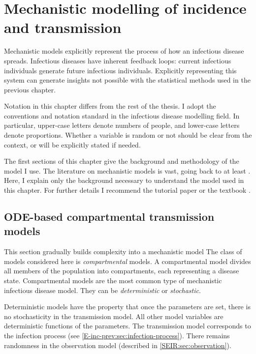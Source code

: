 \documentclass[thesis.tex]{subfiles}
\begin{document}
\ifSubfilesClassLoaded{
    \setcounter{chapter}{8}
}
\chapter{Mechanistic modelling of incidence and transmission} \label{SEIR}

Mechanistic models explicitly represent the process of how an infectious disease spreads.
Infectious diseases have inherent feedback loops: current infectious individuals generate future infectious individuals.
Explicitly representing this system can generate insights not possible with the statistical methods used in the previous chapter.

Notation in this chapter differs from the rest of the thesis.
I adopt the conventions and notation standard in the infectious disease modelling field.
In particular, upper-case letters denote numbers of people, and lower-case letters denote proportions.
Whether a variable is random or not should be clear from the context, or will be explicitly stated if needed.

The first sections of this chapter give the background and methodology of the model I use.
The literature on mechanistic models is vast, going back to at least \textcite{kermackContribution}.
Here, I explain only the background necessary to understand the model used in this chapter.
For further details I recommend the tutorial paper \textcite{kretzschmarMathematical} or the textbook \textcite{keelingModeling}.

\section{ODE-based compartmental transmission models} \label{SEIR:sec:transmission}

This section gradually builds complexity into a mechanistic model
The class of models considered here is \emph{compartmental} models.
A compartmental model divides all members of the population into compartments, each representing a disease state.
Compartmental models are the most common type of mechanistic infectious disease model.
They can be \emph{deterministic} or \emph{stochastic}.

Deterministic models have the property that once the parameters are set, there is no stochasticity in the transmission model.
All other model variables are deterministic functions of the parameters.
The transmission model corresponds to the infection process (see \cref{E-inc-prev:sec:infection-process}).
There remains randomness in the observation model (described in \cref{SEIR:sec:observation}).
\end{document}
